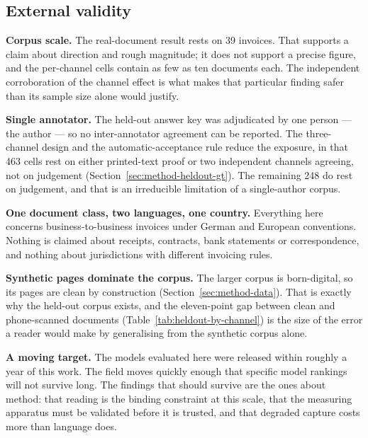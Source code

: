 \subsection{External validity}

\textbf{Corpus scale.} The real-document result rests on 39 invoices. That supports a claim about
direction and rough magnitude; it does not support a precise figure, and the per-channel cells
contain as few as ten documents each. The independent corroboration of the channel effect
\parencite{mdpbench2026} is what makes that particular finding safer than its sample size alone would
justify.

\textbf{Single annotator.} The held-out answer key was adjudicated by one person --- the author
--- so no inter-annotator agreement can be reported. The three-channel design and the
automatic-acceptance rule reduce the exposure, in that 463 cells rest on either
printed-text proof or two independent channels agreeing, not on judgement
(Section~\ref{sec:method-heldout-gt}). The remaining 248 do rest on judgement, and that is an
irreducible limitation of a single-author corpus.

\textbf{One document class, two languages, one country.} Everything here concerns
business-to-business invoices under German and European conventions. Nothing is claimed about
receipts, contracts, bank statements or correspondence, and nothing about jurisdictions with
different invoicing rules.

\textbf{Synthetic pages dominate the corpus.} The larger corpus is born-digital, so its pages
are clean by construction (Section~\ref{sec:method-data}). That is exactly why the held-out corpus
exists, and the eleven-point gap between clean and phone-scanned documents
(Table~\ref{tab:heldout-by-channel}) is the size of the error a reader would make by
generalising from the synthetic corpus alone.

\textbf{A moving target.} The models evaluated here were released within roughly a year of this
work. The field moves quickly enough that specific model rankings will not survive long. The
findings that should survive are the ones about method: that reading is the binding constraint at
this scale, that the measuring apparatus must be validated before it is trusted, and that
degraded capture costs more than language does.
